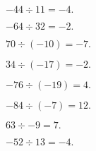\documentclass[12pt]{article}
\newenvironment{problem}[2][Problem]{\begin{trivlist}
\item[\hskip \labelsep {\bfseries #1}\hskip \labelsep {\bfseries #2.}]}{\end{trivlist}}
\begin{document}
\begin{problem}{3}
$-44 \div 11 = \boxed{-4.}$
\end{problem}

\begin{problem}{4}
$-64 \div 32 = \boxed{-2.}$
\end{problem}

\begin{problem}{5}
$70 \div (-10) = \boxed{-7.}$
\end{problem}

\begin{problem}{6}
$34 \div (-17) = \boxed{-2.}$
\end{problem}

\begin{problem}{7}
$-76 \div (-19) = \boxed{4.}$
\end{problem}

\begin{problem}{8}
$-84 \div (-7) = \boxed{12.}$
\end{problem}

\begin{problem}{9}
$63 \div -9 = \boxed{7.}$ 
\end{problem}

\begin{problem}{10}
$-52 \div 13 = \boxed{-4.}$
\end{problem}
\end{document}
